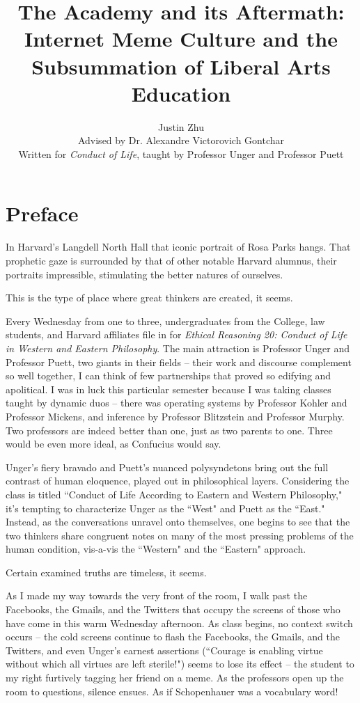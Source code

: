 \documentclass[12pt,letterpaper]{article}
\author{Justin Zhu \\ Advised by Dr. Alexandre Victorovich Gontchar \\ Written for \textit{Conduct of Life}, taught by Professor Unger and Professor Puett}
\title{The Academy and its Aftermath: Internet Meme Culture and the Subsummation of Liberal Arts Education}
\date{}
\begin{document}
\clearpage\maketitle
\thispagestyle{empty}
\pagebreak
\tableofcontents
\pagebreak
\pagestyle{plain}
\setcounter{page}{1}


\section*{Preface}

In Harvard's Langdell North Hall that iconic portrait of Rosa Parks hangs.  That prophetic gaze is surrounded by that of other notable Harvard alumnus, their portraits impressible, stimulating the better natures of ourselves.  

This is the type of place where great thinkers are created, it seems.

Every Wednesday from one to three, undergraduates from the College, law students, and Harvard affiliates file in for \textit{Ethical Reasoning 20: Conduct of Life in Western and Eastern Philosophy}.  The main attraction is Professor Unger and Professor Puett, two giants in their fields -- their work and discourse complement so well together, I can think of few partnerships that proved so edifying and apolitical.  I was in luck this particular semester because I was taking classes taught by dynamic duos -- there was operating systems by Professor Kohler and Professor Mickens, and inference by Professor Blitzstein and Professor Murphy.  Two professors are indeed better than one, just as two parents to one.  Three would be even more ideal, as Confucius would say.

Unger's fiery bravado and Puett's nuanced polysyndetons bring out the full contrast of human eloquence, played out in philosophical layers.  Considering the class is titled ``Conduct of Life According to Eastern and Western Philosophy," it's tempting to characterize Unger as the ``West" and Puett as the ``East."  Instead, as the conversations unravel onto themselves, one begins to see that the two thinkers share congruent notes on many of the most pressing problems of the human condition, vis-a-vis the ``Western" and the ``Eastern" approach.  

Certain examined truths are timeless, it seems.

As I made my way towards the very front of the room, I walk past the Facebooks, the Gmails, and the Twitters that occupy the screens of those who have come in this warm Wednesday afternoon.  As class begins, no context switch occurs -- the cold screens continue to flash the Facebooks, the Gmails, and the Twitters, and even Unger's earnest assertions (``Courage is enabling virtue without which all virtues are left sterile!") seems to lose its effect -- the student to my right furtively tagging her friend on a meme.   As the professors open up the room to questions, silence ensues.  As if Schopenhauer was a vocabulary word!  
\end{document}
